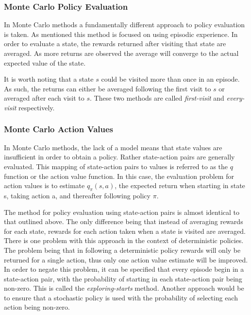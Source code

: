 \subsubsection{Monte Carlo Policy Evaluation}
In Monte Carlo methods a fundamentally different approach to policy evaluation is taken.
As mentioned this method is focused on using episodic experience.
In order to evaluate a state, the rewards returned after visiting that state are averaged.
As more returns are observed the average will converge to the actual expected value of the state.

It is worth noting that a state $s$ could be visited more than once in an episode.
As such, the returns can either be averaged following the first visit to $s$ or averaged
after each visit to $s$.
These two methods are called \textit{first-visit} and \textit{every-visit} respectively.

\subsubsection{Monte Carlo Action Values}
In Monte Carlo methods, the lack of a model means that state values are insufficient in order to
obtain a policy.
Rather state-action pairs are generally evaluated.
This mapping of state-action pairs to values is referred to as the $q$ function or the action value function.
In this case, the evaluation problem for action values is to estimate $q_\pi(s, a)$, the expected return when
starting in state s, taking action a, and thereafter following policy $\pi$\citep{sutton1998reinforcement}.

The method for policy evaluation using state-action pairs is almost identical to that outlined above.
The only difference being that instead of averaging rewards for each state,
rewards for each action taken when a state is visited are averaged.
There is one problem with this approach in the context of deterministic policies.
The problem being that in following a deterministic policy rewards will only be returned
for a single action, thus only one action value estimate will be improved.
In order to negate this problem, it can be specified that every episode begin in a state-action pair,
with the probability of starting in each state-action pair being non-zero.
This is called the \textit{exploring-starts} method.
Another approach would be to ensure that a stochastic policy is used with
the probability of selecting each action being non-zero.

